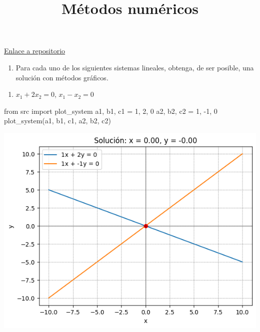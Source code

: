 \documentclass[
  letterpaper,
  DIV=11,
  numbers=noendperiod]{scrartcl}
\title{Métodos numéricos}
\author{}
\date{}
\newenvironment{Shaded}{\begin{snugshade}}{\end{snugshade}}
\newcommand{\DecValTok}[1]{\textcolor[rgb]{0.68,0.00,0.00}{#1}}
\newcommand{\ImportTok}[1]{\textcolor[rgb]{0.00,0.46,0.62}{#1}}
\newcommand{\NormalTok}[1]{\textcolor[rgb]{0.00,0.23,0.31}{#1}}
\newcommand{\OperatorTok}[1]{\textcolor[rgb]{0.37,0.37,0.37}{#1}}
\providecommand{\tightlist}{%
  \setlength{\itemsep}{0pt}\setlength{\parskip}{0pt}}\usepackage{longtable,booktabs,array}
\begin{document}
\maketitle

\href{https://github.com/Bidobelemti/M-todos-num-ricos/tree/main}{Enlace
a repositorio}

\begin{enumerate}
\def\labelenumi{\arabic{enumi}.}
\tightlist
\item
  Para cada uno de los siguientes sistemas lineales, obtenga, de ser
  posible, una solución con métodos gráficos.
\end{enumerate}

\begin{enumerate}
\def\labelenumi{\alph{enumi}.}
\tightlist
\item
  \(x_1 + 2x_2 = 0\), \(x_1 - x_2 = 0\)
\end{enumerate}

\begin{Shaded}
\begin{Highlighting}[]
\ImportTok{from}\NormalTok{ src }\ImportTok{import}\NormalTok{ plot\_system}
\NormalTok{a1, b1, c1 }\OperatorTok{=} \DecValTok{1}\NormalTok{, }\DecValTok{2}\NormalTok{, }\DecValTok{0}
\NormalTok{a2, b2, c2 }\OperatorTok{=} \DecValTok{1}\NormalTok{, }\OperatorTok{{-}}\DecValTok{1}\NormalTok{, }\DecValTok{0}
\NormalTok{plot\_system(a1, b1, c1, a2, b2, c2)}
\end{Highlighting}
\end{Shaded}

\includegraphics{tarea9_files/figure-pdf/cell-2-output-1.png}
\end{document}
